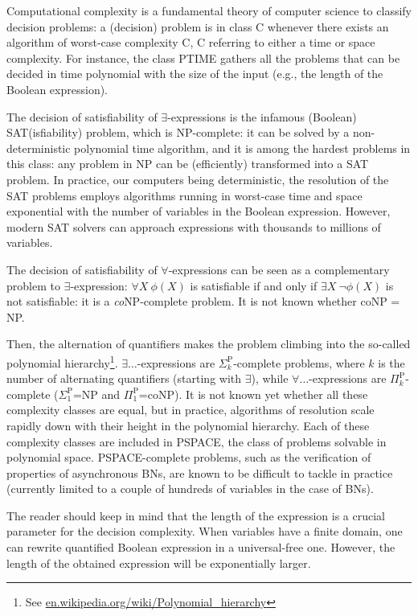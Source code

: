 \documentclass[PCJ,Unicode,screen,mode=plain]{cedram}
\begin{document}
Computational complexity \citep{Papadimitriou} is a fundamental theory
of computer science to classify decision problems: a (decision) problem
is in class C whenever there exists an algorithm of worst-case
complexity C, C referring to either a time or space complexity. For
instance, the class PTIME gathers all the problems that can be decided
in time polynomial with the size of the input (e.g., the length of the
Boolean expression).

The decision of satisfiability of \(\exists\)-expressions is the
infamous (Boolean) SAT(isfiability) problem, which is NP-complete: it
can be solved by a non-deterministic polynomial time algorithm, and it
is among the hardest problems in this class: any problem in NP can be
(efficiently) transformed into a SAT problem. In practice, our computers
being deterministic, the resolution of the SAT problems employs
algorithms running in worst-case time and space exponential with the
number of variables in the Boolean expression. However, modern SAT
solvers can approach expressions with thousands to millions of
variables.

The decision of satisfiability of \(\forall\)-expressions can be seen as
a complementary problem to \(\exists\)-expression: \(\forall X~\phi(X)\)
is satisfiable if and only if \(\exists X~\neg\phi(X)\) is not
satisfiable: it is a \emph{co}NP-complete problem. It is not known
whether coNP = NP.

Then, the alternation of quantifiers makes the problem climbing into the
so-called polynomial hierarchy\footnote{See
  \href{https://en.wikipedia.org/wiki/Polynomial_hierarchy}{en.wikipedia.org/wiki/Polynomial\_hierarchy}}.
\(\exists\ldots\)-expressions are \(\Sigma_k^{\mathrm P}\)-complete
problems, where \(k\) is the number of alternating quantifiers (starting
with \(\exists\)), while \(\forall\ldots\)-expressions are
\(\Pi_k^{\mathrm P}\)-complete (\(\Sigma_1^{\mathrm P}\)=NP and
\(\Pi_1^{\mathrm P}\)=coNP). It is not known yet whether all these
complexity classes are equal, but in practice, algorithms of resolution
scale rapidly down with their height in the polynomial hierarchy. Each
of these complexity classes are included in PSPACE, the class of
problems solvable in polynomial space. PSPACE-complete problems, such as
the verification of properties of asynchronous BNs, are known to be
difficult to tackle in practice (currently limited to a couple of
hundreds of variables in the case of BNs).

The reader should keep in mind that the length of the expression is a
crucial parameter for the decision complexity. When variables have a
finite domain, one can rewrite quantified Boolean expression in a
universal-free one. However, the length of the obtained expression will
be exponentially larger.
\end{document}
